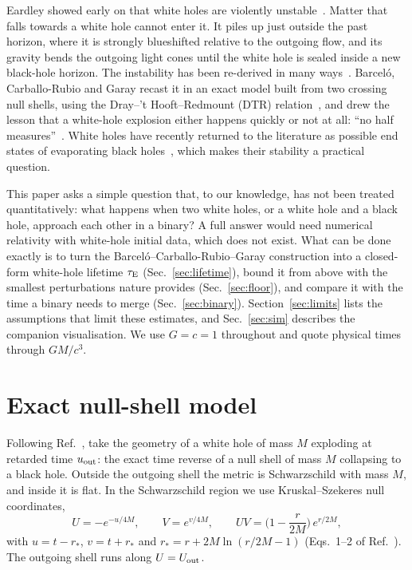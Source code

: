 \documentclass[11pt,a4paper]{article}
\newcommand{\tauE}{\tau_{\rm E}}
\begin{document}
Eardley showed early on that white holes are violently unstable~\cite{Eardley1974}. Matter that falls towards a white hole cannot enter it. It piles up just outside the past horizon, where it is strongly blueshifted relative to the outgoing flow, and its gravity bends the outgoing light cones until the white hole is sealed inside a new black-hole horizon. The instability has been re-derived in many ways~\cite{BBP1993,OriPoisson1994,Blau1989}. Barceló, Carballo-Rubio and Garay recast it in an exact model built from two crossing null shells, using the Dray--'t Hooft--Redmount (DTR) relation~\cite{DrayTHooft1985,Redmount1985}, and drew the lesson that a white-hole explosion either happens quickly or not at all: ``no half measures''~\cite{BCG2016}. White holes have recently returned to the literature as possible end states of evaporating black holes~\cite{HaggardRovelli2015,Bianchi2018}, which makes their stability a practical question.

This paper asks a simple question that, to our knowledge, has not been treated quantitatively: what happens when two white holes, or a white hole and a black hole, approach each other in a binary? A full answer would need numerical relativity with white-hole initial data, which does not exist. What can be done exactly is to turn the Barceló--Carballo-Rubio--Garay construction into a closed-form white-hole lifetime $\tauE$ (Sec.~\ref{sec:lifetime}), bound it from above with the smallest perturbations nature provides (Sec.~\ref{sec:floor}), and compare it with the time a binary needs to merge (Sec.~\ref{sec:binary}). Section~\ref{sec:limits} lists the assumptions that limit these estimates, and Sec.~\ref{sec:sim} describes the companion visualisation. We use $G=c=1$ throughout and quote physical times through $GM/c^3$.

\section{Exact null-shell model}\label{sec:model}

Following Ref.~\cite{BCG2016}, take the geometry of a white hole of mass $M$ exploding at retarded time $u_{\rm out}$: the exact time reverse of a null shell of mass $M$ collapsing to a black hole. Outside the outgoing shell the metric is Schwarzschild with mass $M$, and inside it is flat. In the Schwarzschild region we use Kruskal--Szekeres null coordinates,
\begin{equation}
U = -e^{-u/4M},\qquad V = e^{v/4M},\qquad UV = \Big(1-\frac{r}{2M}\Big)\,e^{r/2M},
\label{eq:kruskal}
\end{equation}
with $u=t-r_*$, $v=t+r_*$ and $r_*=r+2M\ln(r/2M-1)$ (Eqs.~1--2 of Ref.~\cite{BCG2016}). The outgoing shell runs along $U = U_{\rm out}$.
\end{document}
